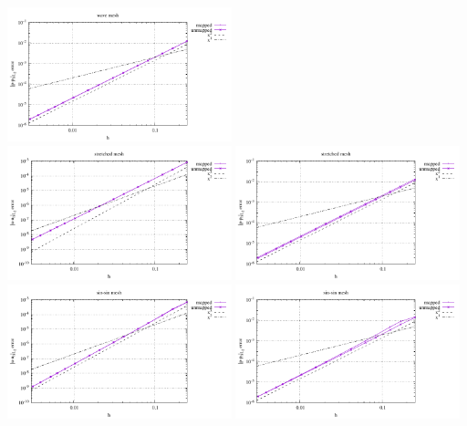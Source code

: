 \begin{center}
\includegraphics[width=6.5cm]{python_codes/fieldstone_76/results/bench9/straight/errors_P_mt3.pdf}\\
\includegraphics[width=6.5cm]{python_codes/fieldstone_76/results/bench9/straight/errors_V_mt4.pdf}
\includegraphics[width=6.5cm]{python_codes/fieldstone_76/results/bench9/straight/errors_P_mt4.pdf}\\
\includegraphics[width=6.5cm]{python_codes/fieldstone_76/results/bench9/straight/errors_V_mt5.pdf}
\includegraphics[width=6.5cm]{python_codes/fieldstone_76/results/bench9/straight/errors_P_mt5.pdf}\\

\end{center}
